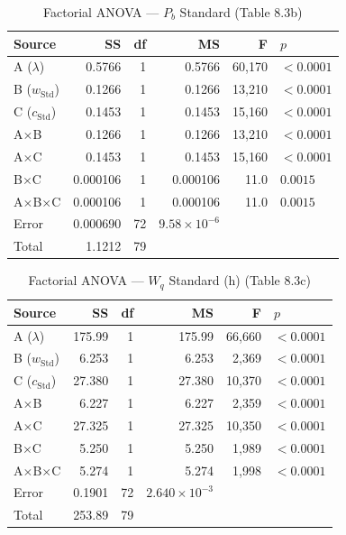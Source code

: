 \documentclass[11pt,a4paper]{article}
\newcommand{\Wq}{\ensuremath{W_q}}
\newcommand{\Pb}{\ensuremath{P_b}}
\newcommand{\lam}{\ensuremath{\lambda}}
\begin{document}
\begin{table}[H]
\centering
\caption{Factorial ANOVA — $\Pb$ Standard (Table 8.3b)}
\begin{tabular}{lrrrrl}
\toprule
\textbf{Source} & \textbf{SS} & \textbf{df} & \textbf{MS} & \textbf{F} & \textbf{$p$} \\
\midrule
A ($\lam$)          & 0.5766   & 1 & 0.5766     & 60{,}170 & $<0.0001$ \\
B ($w_\text{Std}$)  & 0.1266   & 1 & 0.1266     & 13{,}210 & $<0.0001$ \\
C ($c_\text{Std}$)  & 0.1453   & 1 & 0.1453     & 15{,}160 & $<0.0001$ \\
A$\times$B          & 0.1266   & 1 & 0.1266     & 13{,}210 & $<0.0001$ \\
A$\times$C          & 0.1453   & 1 & 0.1453     & 15{,}160 & $<0.0001$ \\
B$\times$C          & 0.000106 & 1 & 0.000106   & 11.0     & $0.0015$  \\
A$\times$B$\times$C & 0.000106 & 1 & 0.000106   & 11.0     & $0.0015$  \\
Error               & 0.000690 & 72 & $9.58\times10^{-6}$ & & \\
Total               & 1.1212   & 79 &            &          & \\
\bottomrule
\end{tabular}
\end{table}

\begin{table}[H]
\centering
\caption{Factorial ANOVA — $\Wq$ Standard (h) (Table 8.3c)}
\begin{tabular}{lrrrrl}
\toprule
\textbf{Source} & \textbf{SS} & \textbf{df} & \textbf{MS} & \textbf{F} & \textbf{$p$} \\
\midrule
A ($\lam$)          & 175.99 & 1 & 175.99 & 66{,}660 & $<0.0001$ \\
B ($w_\text{Std}$)  & 6.253  & 1 & 6.253  & 2{,}369  & $<0.0001$ \\
C ($c_\text{Std}$)  & 27.380 & 1 & 27.380 & 10{,}370 & $<0.0001$ \\
A$\times$B          & 6.227  & 1 & 6.227  & 2{,}359  & $<0.0001$ \\
A$\times$C          & 27.325 & 1 & 27.325 & 10{,}350 & $<0.0001$ \\
B$\times$C          & 5.250  & 1 & 5.250  & 1{,}989  & $<0.0001$ \\
A$\times$B$\times$C & 5.274  & 1 & 5.274  & 1{,}998  & $<0.0001$ \\
Error               & 0.1901 & 72 & $2.640\times10^{-3}$ & & \\
Total               & 253.89 & 79 &        &          & \\
\bottomrule
\end{tabular}
\end{table}
\end{document}
